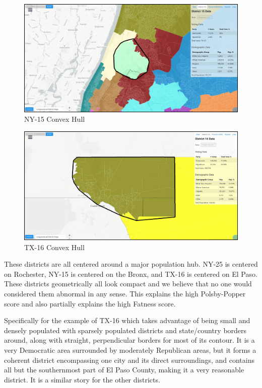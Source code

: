 \documentclass[letterpaper]{article}
\begin{document}
\begin{figure}[H]
	\includegraphics[width=\linewidth]{./figures/NY-15-ConvexHull.png}
	\caption{NY-15 Convex Hull}
	\label{fig:ny15convexHull}
\end{figure}

\begin{figure}[H]
	\includegraphics[width=\linewidth]{./figures/TX-16-ConvexHull.png}
	\caption{TX-16 Convex Hull}
	\label{fig:tx16convexHull}
\end{figure}

These districts are all centered around a major population hub. NY-25 is centered on Rochester, NY-15 is centered on the Bronx, and TX-16 is centered on El Paso. These districts geometrically all look compact and we believe that no one would considered them abnormal in any sense. This explains the high Polsby-Popper score and also partially explains the high Fatness score. 

Specifically for the example of TX-16 which takes advantage of being small and densely populated with sparsely populated districts and state/country borders around, along with straight, perpendicular borders for most of its contour. It is a very Democratic area surrounded by moderately Republican areas, but it forms a coherent district encompassing one city and its direct surroundings, and contains all but the southernmost part of El Paso County, making it a very reasonable district. It is a similar story for the other districts.
\end{document}
